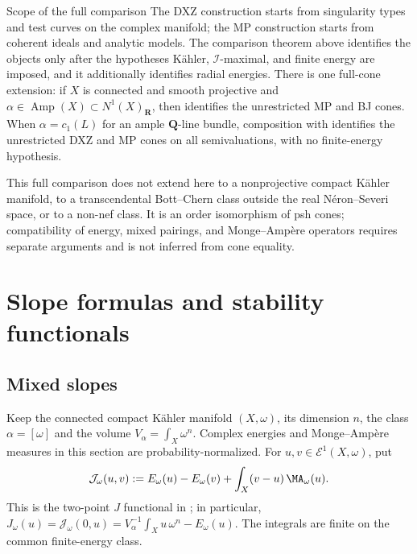 \noindent\begin{minipage}{\linewidth}
\begin{warning}{Scope of the full comparison}
\label{warn:mp-full-comparison}
The DXZ construction starts from singularity types and test curves on the
complex manifold; the MP construction starts from coherent ideals and
analytic models.  The comparison theorem above identifies the objects only
after the hypotheses K\"ahler, $\mathcal I$-maximal, and finite energy are
imposed, and it additionally identifies radial energies.  There is one
full-cone extension: if $X$ is connected and smooth projective and
$\alpha\in\operatorname{Amp}(X)\subset N^1(X)_{\mathbf R}$, then
 identifies the unrestricted MP and
BJ cones.  When $\alpha=c_1(L)$ for an ample $\mathbf Q$-line bundle,
composition with \cite[Theorem~3.14]{DXZ23} identifies the unrestricted
DXZ and MP cones on all semivaluations, with no finite-energy hypothesis.

This full comparison does not extend here to a nonprojective compact
K\"ahler manifold, to a transcendental Bott--Chern class outside the real
N\'eron--Severi space, or to a non-nef class.  It is an order isomorphism of
psh cones; compatibility of energy, mixed pairings, and Monge--Amp\`ere
operators requires separate arguments and is not inferred from cone
equality.
\end{warning}
\end{minipage}\par

\section{Slope formulas and stability functionals}
\label{sec:mp-psh-slopes}
\subsection{Mixed slopes}
\label{subsec:mp-psh-mixed-slopes}



Keep the connected compact K\"ahler manifold $(X,\omega)$, its dimension $n$, the class $\alpha=[\omega]$ and the volume $V_\alpha=\int_X\omega^n$. Complex energies and Monge--Amp\`ere measures in this section are probability-normalized. For $u,v\in\mathcal E^1(X,\omega)$, put
\[
 \mathcal J_\omega(u,v)
 :=E_\omega(u)-E_\omega(v)
       +\int_X(v-u)\,\MA_\omega(u).
\]
This is the two-point $J$ functional in \cite[Proposition~2.2 and its proof]{BJ25FiniteEnergy}; in particular, $J_\omega(u)=\mathcal J_\omega(0,u) =V_\alpha^{-1}\int_Xu\,\omega^n-E_\omega(u)$. The integrals are finite on the common finite-energy class.

